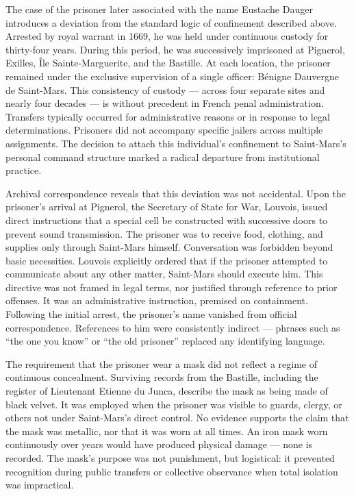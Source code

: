 The case of the prisoner later associated with the name Eustache Dauger introduces a deviation from the standard logic of confinement described above. Arrested by royal warrant in 1669, he was held under continuous custody for thirty-four years. During this period, he was successively imprisoned at Pignerol, Exilles, Île Sainte-Marguerite, and the Bastille. At each location, the prisoner remained under the exclusive supervision of a single officer: Bénigne Dauvergne de Saint-Mars. This consistency of custody — across four separate sites and nearly four decades — is without precedent in French penal administration. Transfers typically occurred for administrative reasons or in response to legal determinations. Prisoners did not accompany specific jailers across multiple assignments. The decision to attach this individual’s confinement to Saint-Mars’s personal command structure marked a radical departure from institutional practice.

Archival correspondence reveals that this deviation was not accidental. Upon the prisoner’s arrival at Pignerol, the Secretary of State for War, Louvois, issued direct instructions that a special cell be constructed with successive doors to prevent sound transmission. The prisoner was to receive food, clothing, and supplies only through Saint-Mars himself. Conversation was forbidden beyond basic necessities. Louvois explicitly ordered that if the prisoner attempted to communicate about any other matter, Saint-Mars should execute him. This directive was not framed in legal terms, nor justified through reference to prior offenses. It was an administrative instruction, premised on containment. Following the initial arrest, the prisoner’s name vanished from official correspondence. References to him were consistently indirect — phrases such as “the one you know” or “the old prisoner” replaced any identifying language.

The requirement that the prisoner wear a mask did not reflect a regime of continuous concealment. Surviving records from the Bastille, including the register of Lieutenant Etienne du Junca, describe the mask as being made of black velvet. It was employed when the prisoner was visible to guards, clergy, or others not under Saint-Mars’s direct control. No evidence supports the claim that the mask was metallic, nor that it was worn at all times. An iron mask worn continuously over years would have produced physical damage — none is recorded. The mask’s purpose was not punishment, but logistical: it prevented recognition during public transfers or collective observance when total isolation was impractical.

